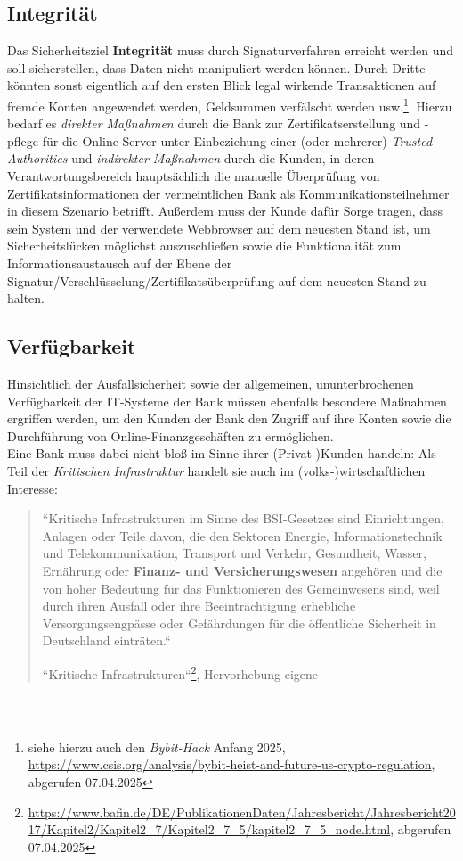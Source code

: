 \subsection{Integrität}
Das Sicherheitsziel \textbf{Integrität} muss durch Signaturverfahren erreicht werden und soll sicherstellen, dass Daten nicht manipuliert werden können. Durch Dritte könnten sonst eigentlich auf den ersten Blick legal wirkende Transaktionen auf fremde Konten angewendet werden, Geldsummen verfälscht werden usw.\footnote{
    siehe hierzu auch den \textit{Bybit-Hack} Anfang 2025, \url{https://www.csis.org/analysis/bybit-heist-and-future-us-crypto-regulation}, abgerufen 07.04.2025
}.
Hierzu bedarf es \textit{direkter Maßnahmen} durch die Bank zur Zertifikatserstellung und -pflege für die Online-Server unter Einbeziehung einer (oder mehrerer) \textit{Trusted Authorities} und \textit{indirekter Maßnahmen} durch die Kunden, in deren Verantwortungsbereich hauptsächlich die manuelle Überprüfung von Zertifikatsinformationen der vermeintlichen Bank als Kommunikationsteilnehmer in diesem Szenario betrifft. Außerdem muss der Kunde dafür Sorge tragen, dass sein System und der verwendete Webbrowser auf dem neuesten Stand ist, um Sicherheitslücken möglichst auszuschließen sowie die Funktionalität zum Informationsaustausch auf der Ebene der Signatur/Verschlüsselung/Zertifikatsüberprüfung auf dem neuesten Stand zu halten.

\subsection{Verfügbarkeit}
Hinsichtlich der Ausfallsicherheit sowie der allgemeinen, ununterbrochenen Verfügbarkeit der IT-Systeme der Bank müssen ebenfalls besondere Maßnahmen ergriffen werden, um den Kunden der Bank den Zugriff auf ihre Konten sowie die Durchführung von Online-Finanzgeschäften zu ermöglichen.\\
Eine Bank muss dabei nicht bloß im Sinne ihrer (Privat-)Kunden handeln: Als Teil der \textit{Kritischen Infrastruktur} handelt sie auch im (volks-)wirtschaftlichen Interesse:

\blockquote[{``Kritische Infrastrukturen``\footnote{
    \url{https://www.bafin.de/DE/PublikationenDaten/Jahresbericht/Jahresbericht2017/Kapitel2/Kapitel2_7/Kapitel2_7_5/kapitel2_7_5_node.html}, abgerufen 07.04.2025
}, Hervorhebung eigene}]{
    ``Kritische Infrastrukturen im Sinne des BSI-Gesetzes sind Einrichtungen, Anlagen oder Teile davon, die den Sektoren Energie, Informationstechnik und Telekommunikation, Transport und Verkehr, Gesundheit, Wasser, Ernährung oder \textbf{Finanz- und Versicherungswesen} angehören und die von hoher Bedeutung für das Funktionieren des Gemeinwesens sind, weil durch ihren Ausfall oder ihre Beeinträchtigung erhebliche Versorgungsengpässe oder Gefährdungen für die öffentliche Sicherheit in Deutschland einträten.``
}\\

